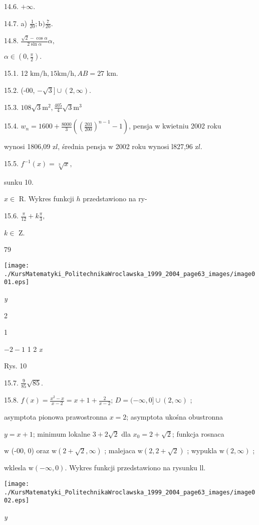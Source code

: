 \documentclass[a4paper,12pt]{article}
\begin{document}
14.6. $+\infty.$

14.7. a) $\displaystyle \frac{1}{20};\mathrm{b}) \displaystyle \frac{7}{20}.$

14.8. $\displaystyle \frac{\sqrt{2}-\cos\alpha}{2\sin\alpha}\alpha,$

$\alpha\in (0,\displaystyle \frac{\pi}{2}).$

15.1. 12 $\mathrm{k}\mathrm{m}/\mathrm{h}, 15\mathrm{k}\mathrm{m}/\mathrm{h}, AB=27$ km.

15.2. (-00, $-\sqrt{3}]\cup(2,\infty).$

15.3. $108\sqrt{3}\mathrm{m}^{2}, \displaystyle \frac{405}{4}\sqrt{3}\mathrm{m}^{3}$

15.4. $w_{n}=1600+\displaystyle \frac{8000}{3}((\frac{203}{200})^{n-1}-1)$, pensja $\mathrm{w}$ kwietniu 2002 roku

wynosi 1806,09 $\mathrm{z}l$, średnia pensja $\mathrm{w}$ 2002 roku wynosi l827,96 $\mathrm{z}l.$

15.5. $f^{-1}(x) = \sqrt[3]{x},$

sunku 10.

$x \in$ R. Wykres funkcji $h$ przedstawiono na ry-

15.6. $\displaystyle \frac{\pi}{12}+k\frac{\pi}{3},$

$k \in$ Z.





79
\begin{center}
\texttt{[image: ./KursMatematyki\_PolitechnikaWroclawska\_1999\_2004\_page63\_images/image001.eps]}
\end{center}
{\it y}

2

1

$-2  -1$  1 2  {\it x}

Rys. 10

15.7. $\displaystyle \frac{9}{85}\sqrt{85}.$

15.8. $f(x) = \displaystyle \frac{x^{2}-x}{x-2} = x+ 1 + \displaystyle \frac{2}{x-2}$; $D = (-\infty,0]\cup(2,\infty)$ ;

asymptota pionowa prawostronna $x = 2$; asymptota ukośna obustronna

$y = x+1$; minimum lokalne $3+2\sqrt{2}$ dla $x_{0} = 2+\sqrt{2}$; funkcja rosnaca

$\mathrm{w}$ (-00, 0) oraz $\mathrm{w}(2+\sqrt{2},\infty)$ ; malejaca $\mathrm{w}(2,2+\sqrt{2})$ ; wypukla $\mathrm{w}(2,\infty)$ ;

wklesla $\mathrm{w}(-\infty,0)$. Wykres funkcji przedstawiono na rysunku ll.
\begin{center}
\texttt{[image: ./KursMatematyki\_PolitechnikaWroclawska\_1999\_2004\_page63\_images/image002.eps]}
\end{center}
{\it y}
\end{document}
